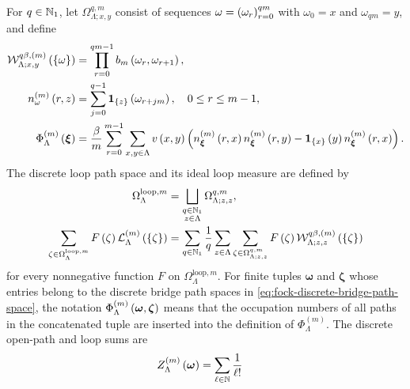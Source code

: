\documentclass[11pt,a4paper]{article}
\theoremstyle{plain}
\theoremstyle{definition}
\theoremstyle{remark}
\begin{document}
For \(q \in \mathbb{N}_1\), let \(\Omega_{\Lambda;x,y}^{q,m}\) consist of sequences \(\omega = \seq{\omega_r}{r = 0}^{q m}\) with \(\omega_0 = x\) and \(\omega_{q m} = y\), and define \begin{equation}
\begin{aligned}
\fun{\msrcal{W}_{\Lambda;x,y}^{q\beta,(m)}}{\setone{\omega}}
& =
\prod_{r = 0}^{q m - 1}\fun{b_m}{\omega_r,\omega_{r + 1}},
\\
\fun{n_{\omega}^{(m)}}{r,z}
& =
\sum_{j = 0}^{q - 1}
\fun{\fndef{\setone{z}}}{\omega_{r + j m}},
\quad
0 \leq r \leq m - 1,
\\
\fun{\Phi_{\Lambda}^{(m)}}{\boldsymbol{\xi}}
& =
\frac{\sminvtemperature}{m}
\sum_{r = 0}^{m - 1}
\sum_{x,y \in \Lambda}
\fun{v}{x,y}
\rbk{
\fun{n_{\boldsymbol{\xi}}^{(m)}}{r,x}
\fun{n_{\boldsymbol{\xi}}^{(m)}}{r,y}
-
\fun{\fndef{\setone{x}}}{y}
\fun{n_{\boldsymbol{\xi}}^{(m)}}{r,x}}.
\end{aligned}
\label{eq:fock-discrete-bridge-path-space}
\end{equation} The discrete loop path space and its ideal loop measure are defined by \begin{equation}
\begin{aligned}
\Omega_{\Lambda}^{\mathrm{loop},m}
& =
\bigsqcup_{\substack{q \in \mathbb{N}_1 \\ z \in \Lambda}}
\Omega_{\Lambda;z,z}^{q,m},
\\
\sum_{\zeta \in \Omega_{\Lambda}^{\mathrm{loop},m}}
F \left( \zeta \right)
\mathcal{L}_{\Lambda}^{(m)} \left( \left\{ \zeta \right\} \right)
& =
\sum_{q \in \mathbb{N}_1}\frac{1}{q}
\sum_{z \in \Lambda}
\sum_{\zeta \in \Omega_{\Lambda;z,z}^{q,m}}
F \left( \zeta \right)
\mathcal{W}_{\Lambda;z,z}^{q\beta,(m)} \left( \left\{ \zeta \right\} \right)
\end{aligned}
\label{eq:fock-discrete-ideal-loop-measure}
\end{equation} for every nonnegative function \(F\) on \(\Omega_{\Lambda}^{\mathrm{loop},m}\). For finite tuples \(\boldsymbol{\omega}\) and \(\boldsymbol{\zeta}\) whose entries belong to the discrete bridge path spaces in \eqref{eq:fock-discrete-bridge-path-space}, the notation \(\Phi_{\Lambda}^{(m)} \left( \boldsymbol{\omega},\boldsymbol{\zeta} \right)\) means that the occupation numbers of all paths in the concatenated tuple are inserted into the definition of \(\Phi_{\Lambda}^{(m)}\). The discrete open-path and loop sums are \begin{equation}
\begin{aligned}
\fun{Z_{\Lambda}^{(m)}}{\boldsymbol{\omega}}
& =
\sum_{\ell \in \monnat}\frac{1}{\ell!}

\end{aligned}
\end{equation}
\end{document}
